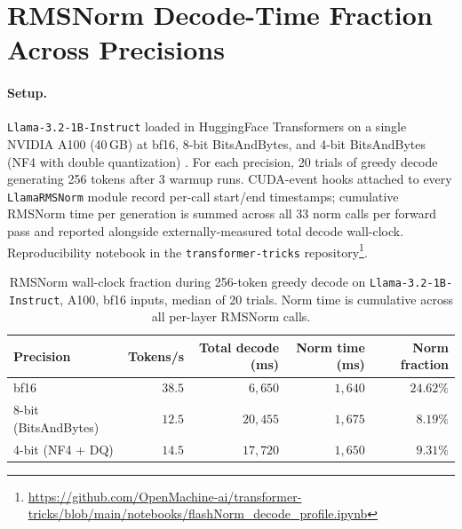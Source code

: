 \documentclass{article}
\begin{document}
\section{RMSNorm Decode-Time Fraction Across Precisions}\label{app:rmsnorm-fraction}

\paragraph{Setup.} \texttt{Llama-3.2-1B-Instruct} loaded in HuggingFace Transformers on a single NVIDIA A100 (40\,GB) at bf16, 8-bit BitsAndBytes, and 4-bit BitsAndBytes (NF4 with double quantization) \citep{bitsandbytes}. For each precision, 20 trials of greedy decode generating 256 tokens after 3 warmup runs. CUDA-event hooks attached to every \texttt{LlamaRMSNorm} module record per-call start/end timestamps; cumulative RMSNorm time per generation is summed across all 33 norm calls per forward pass and reported alongside externally-measured total decode wall-clock.
Reproducibility notebook in the \texttt{transformer-tricks} repository\footnote{\url{https://github.com/OpenMachine-ai/transformer-tricks/blob/main/notebooks/flashNorm\_decode\_profile.ipynb}}.

\begin{table}[h!] \centering
\caption{RMSNorm wall-clock fraction during 256-token greedy decode on \texttt{Llama-3.2-1B-Instruct}, A100, bf16 inputs, median of 20 trials. Norm time is cumulative across all per-layer RMSNorm calls.}
\label{tab:rmsnorm-fraction}
\begin{tabular}{l r r r r}
\hline
Precision & Tokens/s & Total decode (ms) & Norm time (ms) & Norm fraction \\
\hline
bf16                  & $38.5$ & $6{,}650$  & $1{,}640$ & $\mathbf{24.62\%}$ \\
8-bit (BitsAndBytes)  & $12.5$ & $20{,}455$ & $1{,}675$ & $8.19\%$ \\
4-bit (NF4 + DQ)      & $14.5$ & $17{,}720$ & $1{,}650$ & $9.31\%$ \\
\hline
\end{tabular}
\end{table}
\end{document}
